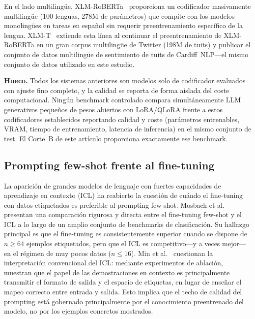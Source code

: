 \documentclass[conference]{IEEEtran}
\begin{document}
En el lado multilingüe, XLM-RoBERTa~\cite{conneau2020xlmr} proporciona un
codificador masivamente multilingüe (100 lenguas, 278M de parámetros) que
compite con los modelos monolingües en tareas en español sin requerir
preentrenamiento específico de la lengua.
XLM-T~\cite{barbieri2022xlmt} extiende esta línea al continuar el
preentrenamiento de XLM-RoBERTa en un gran corpus multilingüe de Twitter
(198M de tuits) y publicar el conjunto de datos multilingüe de sentimiento de
tuits de Cardiff~NLP---el mismo conjunto de datos utilizado en este estudio.

\textbf{Hueco.}
Todos los sistemas anteriores son modelos solo de codificador evaluados con
ajuste fino completo, y la calidad se reporta de forma aislada del coste
computacional.
Ningún benchmark controlado compara simultáneamente LLM generativos pequeños de
pesos abiertos con LoRA/QLoRA frente a estos codificadores establecidos
reportando calidad y coste (parámetros entrenables, VRAM, tiempo de
entrenamiento, latencia de inferencia) en el mismo conjunto de test.
El Corte~B de este artículo proporciona exactamente ese benchmark.

\subsection{Prompting few-shot frente al fine-tuning}
\label{sec:related_dialectal}

La aparición de grandes modelos de lenguaje con fuertes capacidades de
aprendizaje en contexto (ICL) ha reabierto la cuestión de cuándo el fine-tuning
con datos etiquetados es preferible al prompting few-shot.
Mosbach et al.~\cite{mosbach2023fewshot} presentan una comparación rigurosa y
directa entre el fine-tuning few-shot y el ICL a lo largo de un amplio conjunto
de benchmarks de clasificación.
Su hallazgo principal es que el fine-tuning es consistentemente superior cuando
se dispone de $n \geq 64$ ejemplos etiquetados, pero que el ICL es
competitivo---y a veces mejor---en el régimen de muy pocos datos ($n \leq 16$).
Min et al.~\cite{min2022rethinking} cuestionan la interpretación convencional
del ICL: mediante experimentos de ablación, muestran que el papel de las
demostraciones en contexto es principalmente transmitir el formato de salida y
el espacio de etiquetas, en lugar de enseñar el mapeo correcto entre entrada y
salida.
Esto implica que el techo de calidad del prompting está gobernado principalmente
por el conocimiento preentrenado del modelo, no por los ejemplos concretos
mostrados.
\end{document}
